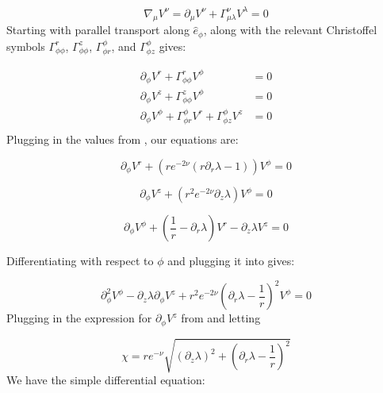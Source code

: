 \documentclass{article}
\begin{document}
\begin{equation}
\label{eq:x-par-xport}
\nabla_\mu V^{\nu}=\partial_\mu V^\nu+\Gamma^\nu_{\mu\lambda} V^\lambda=0
\end{equation}	  	
Starting with parallel transport along $\hat{e}_{\phi}$,  along with the relevant Christoffel symbols $\Gamma^{r}_{\phi\phi}$, $\Gamma^{z}_{\phi\phi}$, $\Gamma^{\phi}_{\phi r}$, and $\Gamma^{\phi}_{\phi z}$ gives:
	  	
\begin{equation}
\begin{aligned}
\partial_{\phi}V^{r}+\Gamma^{r}_{\phi\phi}V^{\phi}&=0\\
\partial_{\phi}V^{z}+\Gamma^{z}_{\phi\phi}V^{\phi}&=0\\
\partial_{\phi}V^{\phi}+\Gamma^{\phi}_{\phi r}V^{r}+\Gamma^{\phi}_{\phi z}V^{z}&=0\\
\end{aligned}
\end{equation}
Plugging in the values from , our equations are: 

\begin{equation}
\partial_{\phi}V^{r}+\left(re^{-2\nu}\left(r\partial_{r}\lambda-1\right)\right)V^{\phi}=0\label{eq:V-r-phi}
\end{equation}

\begin{equation}
\label{eq:V_z-V_phi}
\partial_{\phi}V^{z}+\left(r^{2}e^{-2\nu}\partial_{z}\lambda\right)V^{\phi}=0
\end{equation}

\begin{equation}
\partial_{\phi}V^{\phi}+\left(\frac{1}{r}-\partial_{r}\lambda\right)V^{r}-\partial_{z}\lambda V^{z}=0\label{eq:V-phi-r-z}
\end{equation}

Differentiating  with respect to $\phi$ and plugging it into  gives:

\begin{equation}
\partial^{2}_{\phi}V^{\phi}-\partial_z\lambda\partial_{\phi}V^z+r^{2}e^{-2\nu}\left(\partial_r\lambda-\frac{1}{r}\right)^2V^{\phi}=0
\end{equation}
Plugging in the expression for $\partial_{\phi}V^z$ from
 and letting 

\begin{equation}
\label{eq:def-chi}
\chi=re^{-\nu}\sqrt{\left(\partial_z\lambda\right)^2+\left(\partial_r\lambda-\frac{1}{r}\right)^2}
\end{equation}
We have the simple differential equation:
\end{document}
